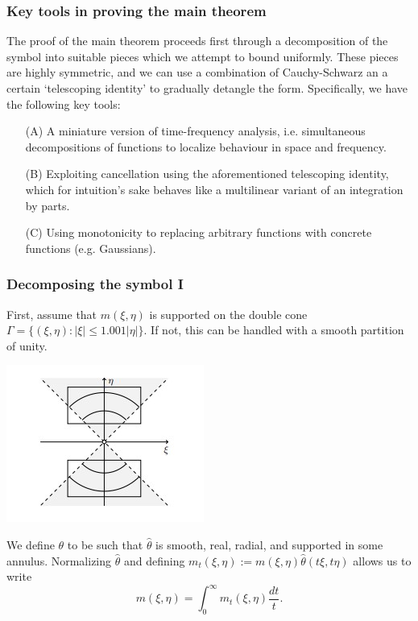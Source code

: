 \documentclass[usenames,dvipsnames,12pt]{beamer}
\begin{document}
\begin{frame}
\frametitle{Key tools in proving the main theorem}
The proof of the main theorem proceeds first through a decomposition of the symbol into suitable pieces which we attempt to bound uniformly. These pieces are highly symmetric, and we can use a combination of Cauchy-Schwarz an a certain `telescoping identity' to gradually detangle the form.
\vspace{2mm}
\pause
Specifically, we have the following key tools:
\begin{enumerate}
    \item[(A)] A miniature version of time-frequency analysis, i.e. simultaneous decompositions of functions to localize behaviour in space and frequency.
\pause

    \item[(B)] Exploiting cancellation using the aforementioned telescoping identity, which for intuition's sake behaves like a multilinear variant of an integration by parts.
\pause

    \item[(C)] Using monotonicity to replacing arbitrary functions with concrete functions (e.g. Gaussians).
\end{enumerate}

\end{frame}

\begin{frame}
\frametitle{Decomposing the symbol I}

First, assume that $m(\xi, \eta)$ is supported on the double cone $\Gamma = \{ (\xi,\eta): |\xi| \leq 1.001 |\eta| \}$. If not, this can be handled with a smooth partition of unity.
\pause
\begin{center}
\includegraphics[scale=0.6]{MultiplierCone.jpg}
\end{center}
\pause
We define $\theta$ to be such that $\hat{\theta}$ is smooth, real, radial, and supported in some annulus. Normalizing $\hat{\theta}$ and defining $m_t(\xi, \eta):=m(\xi,\eta)\hat{\theta}(t\xi,t\eta)$ allows us to write
\begin{equation*}
    m(\xi, \eta) =\int_0^\infty m_t(\xi, \eta)\dfrac{dt}{t}.
\end{equation*}
\end{frame}
\end{document}

